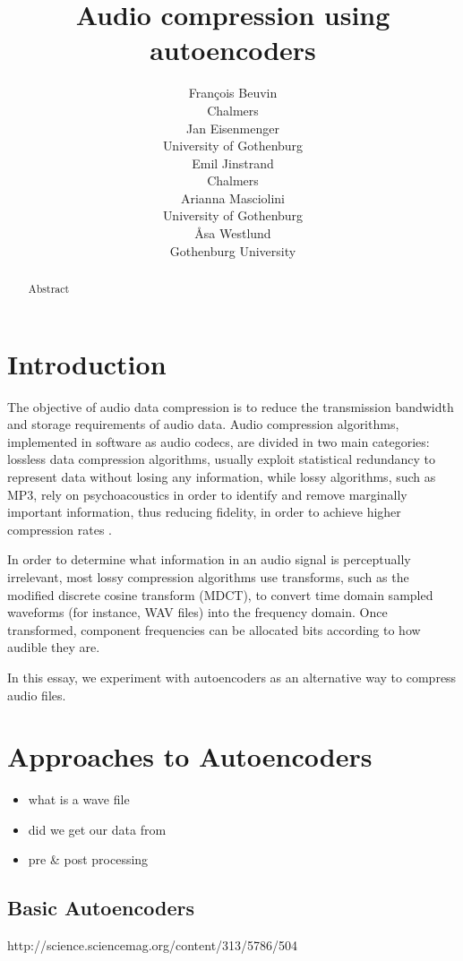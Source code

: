 \documentclass[11pt]{article}
\title{Audio compression using autoencoders}
\author{Fran\c{c}ois Beuvin \\
  Chalmers \\
  \And
  Jan Eisenmenger \\
  University of Gothenburg \\
  \And
  Emil Jinstrand \\
  Chalmers \\
  \AND
  Arianna Masciolini \\
  University of Gothenburg\\
  \And
  \r{A}sa Westlund \\
  Gothenburg University\\}
\date{}
\begin{document}
\maketitle
\begin{abstract}
Abstract
\end{abstract}

\nocite{*}



\section{Introduction}
The objective of audio data compression is to reduce the transmission bandwidth and storage requirements of audio data. Audio compression algorithms, implemented in software as audio codecs, are divided in two main categories: lossless data compression algorithms,  usually exploit statistical redundancy to represent data without losing any information, while lossy algorithms, such as MP3, rely on psychoacoustics in order to identify and remove marginally important information, thus reducing fidelity, in order to achieve higher compression rates \cite{Mahdi.2012}.

In order to determine what information in an audio signal is perceptually irrelevant, most lossy compression algorithms use transforms, such as the modified discrete cosine transform (MDCT), to convert time domain sampled waveforms (for instance, WAV files) into the frequency domain. Once transformed, component frequencies can be allocated bits according to how audible they are. 

In this essay,  we experiment with autoencoders as an alternative way to compress audio files.

\section{Approaches to Autoencoders}
\begin{itemize}
    \item what is a wave file
    \item did we get our data from
    \item pre \& post processing
\end{itemize}
    	
   
\subsection{Basic Autoencoders}
http://science.sciencemag.org/content/313/5786/504
\end{document}
